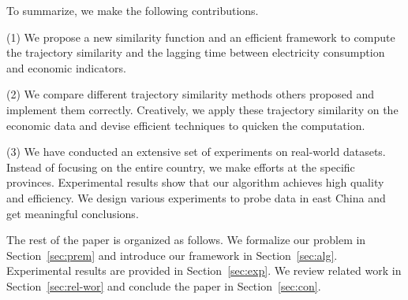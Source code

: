 To summarize, we make the following contributions. 

\vspace{.25em}
\noindent (1) We propose a new similarity function and an efficient framework to compute the trajectory similarity and the lagging time between electricity consumption and economic indicators.

\vspace{.25em}
\noindent (2) We compare different trajectory similarity methods others proposed and implement them correctly. Creatively, we apply these trajectory similarity on the economic data and devise efficient techniques to quicken the computation.  

\vspace{.25em}
\noindent (3) We have conducted an extensive set of experiments on real-world datasets. Instead of focusing on the entire country, we make efforts at the specific provinces. Experimental results show that our algorithm achieves high quality and efficiency. We design various experiments to probe data in east China and get meaningful conclusions.

\vspace{.25em}

The rest of the paper is organized as follows. We formalize our problem in Section~\ref{sec:prem} and introduce our framework in Section~\ref{sec:alg}. Experimental results are provided in Section~\ref{sec:exp}. We review related work in Section~\ref{sec:rel-wor} and conclude the paper in Section~\ref{sec:con}.

